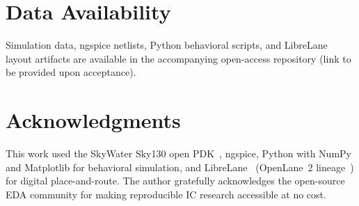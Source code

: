 \documentclass[a4paper,fleqn]{cas-sc}
\begin{document}
\section*{Data Availability}
Simulation data, ngspice netlists, Python behavioral scripts, and LibreLane layout
artifacts are available in the accompanying open-access repository (link to be
provided upon acceptance).

\section*{Acknowledgments}
This work used the SkyWater Sky130 open PDK~\cite{SkyWater2020}, ngspice, Python with
NumPy and Matplotlib for behavioral simulation, and
LibreLane~\cite{LibreLane2024} (OpenLane~2 lineage~\cite{OpenLane2024}) for digital
place-and-route. The author gratefully acknowledges the open-source EDA community for
making reproducible IC research accessible at no cost.



\end{document}

